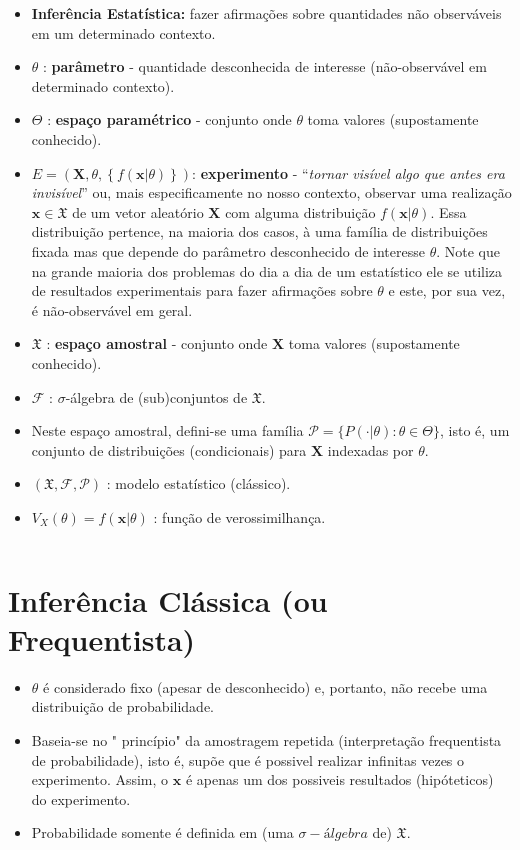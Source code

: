 \documentclass[
]{book}
\begin{document}
\begin{itemize}
\item
  \textbf{Inferência Estatística:} fazer afirmações sobre quantidades não observáveis em um determinado contexto.
\item
  \(\theta\) : \textbf{parâmetro} - quantidade desconhecida de interesse (não-observável em determinado contexto).
\item
  \(\Theta\) : \textbf{espaço paramétrico} - conjunto onde \(\theta\) toma valores (supostamente conhecido).
\item
  \(E=\left(\boldsymbol X, \theta, \left\{f(\boldsymbol x|\theta)\right\}\right)\): \textbf{experimento} - ``\emph{tornar visível algo que antes era invisível}'' ou, mais especificamente no nosso contexto, observar uma realização \(\boldsymbol x \in \mathfrak{X}\) de um vetor aleatório \(\boldsymbol X\) com alguma distribuição \(f(\boldsymbol x|\theta)\). Essa distribuição pertence, na maioria dos casos, à uma família de distribuições fixada mas que depende do parâmetro desconhecido de interesse \(\theta\). Note que na grande maioria dos problemas do dia a dia de um estatístico ele se utiliza de resultados experimentais para fazer afirmações sobre \(\theta\) e este, por sua vez, é não-observável em geral.
\item
  \(\mathfrak{X}\) : \textbf{espaço amostral} - conjunto onde \(\boldsymbol X\) toma valores (supostamente conhecido).
\item
  \(\mathcal{F}\) : \(\sigma\)-álgebra de (sub)conjuntos de \(\mathfrak{X}\).
\item
  Neste espaço amostral, defini-se uma família \(\mathcal{P}=\{P(\cdot|\theta): \theta \in \Theta\}\), isto é, um conjunto de distribuições (condicionais) para \(\boldsymbol X\) indexadas por \(\theta\).
\item
  \((\mathfrak{X},\mathcal{F},\mathcal{P})\) : modelo estatístico (clássico).
\item
  \(V_X(\theta)=f(\boldsymbol x |\theta)\) : função de verossimilhança.
\end{itemize}

\(~\)

\hypertarget{inferuxeancia-cluxe1ssica-ou-frequentista}{%
\section{Inferência Clássica (ou Frequentista)}\label{inferuxeancia-cluxe1ssica-ou-frequentista}}

\begin{itemize}
\item
  \(\theta\) é considerado fixo (apesar de desconhecido) e, portanto, não recebe uma distribuição de probabilidade.
\item
  Baseia-se no " princípio" da amostragem repetida (interpretação frequentista de probabilidade), isto é, supõe que é possivel realizar infinitas vezes o experimento. Assim, o \(\boldsymbol x\) é apenas um dos possiveis resultados (hipóteticos) do experimento.
\item
  Probabilidade somente é definida em (uma \(\sigma-álgebra\) de) \(\mathfrak{X}\).
\end{itemize}
\end{document}

